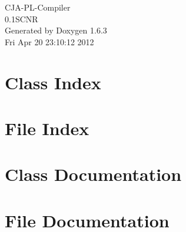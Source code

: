 \documentclass[a4paper]{book}
\begin{document}
\hypersetup{pageanchor=false}
\begin{titlepage}
\vspace*{7cm}
\begin{center}
{\Large CJA-\/PL-\/Compiler \\[1ex]\large 0.1SCNR }\\
\vspace*{1cm}
{\large Generated by Doxygen 1.6.3}\\
\vspace*{0.5cm}
{\small Fri Apr 20 23:10:12 2012}\\
\end{center}
\end{titlepage}
\clearemptydoublepage
{}
\tableofcontents
\clearemptydoublepage
{}
\hypersetup{pageanchor=true}
\chapter{Class Index}

\chapter{File Index}

\chapter{Class Documentation}











\chapter{File Documentation}























\printindex
\end{document}

